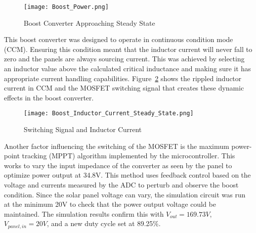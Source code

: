 \begin{figure}
\centering
\texttt{[image: Boost\_Power.png]}
\caption{Boost Converter Approaching Steady State}
\label{boostApproachSteady}
\end{figure}

This boost converter was designed to operate in continuous condition mode (CCM). Ensuring this condition meant that the inductor current will  never fall to zero and the panels are always sourcing current. This was achieved by selecting an inductor value above the calculated critical inductance and making sure it has appropriate current handling capabilities. Figure~\ref{inductorCurrent} shows the rippled inductor current in CCM and the MOSFET switching signal that creates these dynamic effects in the boost converter. 

\begin{figure}
\centering
\texttt{[image: Boost\_Inductor\_Current\_Steady\_State.png]}
\caption{Switching Signal and Inductor Current}
\label{inductorCurrent}
\end{figure}

Another factor influencing the switching of the MOSFET is the maximum power-point tracking (MPPT) algorithm implemented by the microcontroller. This works to vary the input impedance of the converter as seen by the panel to optimize power output at 34.8V. This method uses feedback control based on the voltage and currents measured by the ADC to perturb and observe the boost condition. Since the solar panel voltage can vary, the simulation circuit was run at the minimum 20V to check that the power output voltage could be maintained. The simulation results confirm this with $V_{out}=169.73V$, $V_{panel,in}=20V$, and a new duty cycle set at 89.25\%. 

